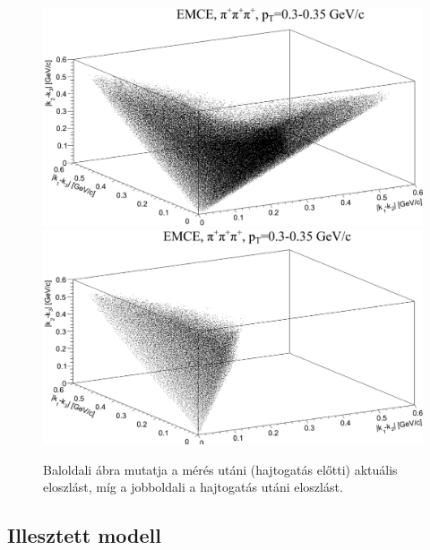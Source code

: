 \documentclass[11pt,a4paper]{article}
\numberwithin{equation}{subsection}
\numberwithin{figure}{section}
\begin{document}
\begin{figure}[H]
\centering
\includegraphics[scale=0.24]{pic/corrfunc/C1}
\includegraphics[scale=0.24]{pic/corrfunc/C2}
\caption{Baloldali ábra mutatja a mérés utáni (hajtogatás előtti) aktuális eloszlást, míg a jobboldali a hajtogatás utáni eloszlást.}
\label{fig:f4}
\end{figure}


\subsection{Illesztett modell}
\end{document}
